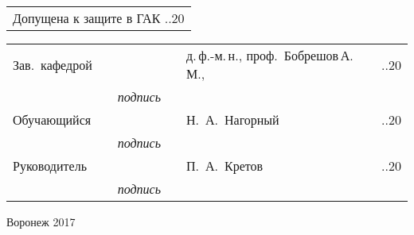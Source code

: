 \begin{titlepage}
\begin{tabularx}{\textwidth}{l}
Допущена к защите в ГАК \hspace{10mm} \underline{\hspace{5mm}}.\underline{\hspace{5mm}}.20\underline{\hspace{5mm}}\\
\end{tabularx}
\hfill \break
\begin{tabularx}{\textwidth}{llcllll}
Зав.~кафедрой & \hspace{2mm} & \underline{\hspace{15mm}} & \hspace{2mm} & д.\,ф.-м.\,н., проф.~Бобрешов\,А.\,М.,
& \hspace{2mm} & \underline{\hspace{5mm}}.\underline{\hspace{5mm}}.20\underline{\hspace{5mm}} \\
&& {\footnotesize \textit{подпись}} &&&& \\
Обучающийся & \hspace{2mm} & \underline{\hspace{15mm}} & \hspace{2mm} & Н.~А.~Нагорный & \hspace{2mm} & \underline{\hspace{5mm}}.\underline{\hspace{5mm}}.20\underline{\hspace{5mm}} \\
&& {\footnotesize \textit{подпись}} &&&& \\
Руководитель & \hspace{2mm} & \underline{\hspace{15mm}} & \hspace{2mm} & П.~А.~Кретов & \hspace{2mm} & \underline{\hspace{5mm}}.\underline{\hspace{5mm}}.20\underline{\hspace{5mm}} \\
&& {\footnotesize \textit{подпись}} &&&& \\

\end{tabularx}

\vspace*{\fill}

Воронеж 2017

\end{titlepage}

\setcounter{page}{2}